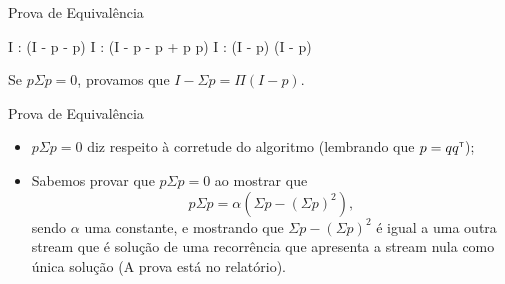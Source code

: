 \begin{frame}{Prova de Equivalência}

  \vspace{0.5cm}

  \begin{calculation}[=]
    I : (I - p - \Sigma p)
    I : (I - p - \Sigma p + p \Sigma p)
    I : (I - p) \cdot (I - \Sigma p)
  \end{calculation}

  \pause

  \begin{center}
    Se $p \Sigma p = 0$, provamos que $I - \Sigma p = \Pi (I - p)$.
  \end{center}
\end{frame}

\begin{frame}{Prova de Equivalência}
  \begin{itemize}
    \item $p \Sigma p = 0$ diz respeito à corretude do algoritmo (lembrando que $p = qq^{\scriptscriptstyle\mathsf{T}\mkern-1mu}$); \\[0.5cm] \pause
    \item Sabemos provar que $p \Sigma p = 0$ ao mostrar que \[p \Sigma p = \alpha \left( \Sigma p - \left( \Sigma p \right)^2 \right),\] sendo $\alpha$ uma constante, e mostrando que $\Sigma p - \left( \Sigma p \right)^2$ é igual a uma outra stream que é solução de uma recorrência que apresenta a stream nula como única solução (A prova está no relatório). \\[0.5cm]
  \end{itemize}
\end{frame}